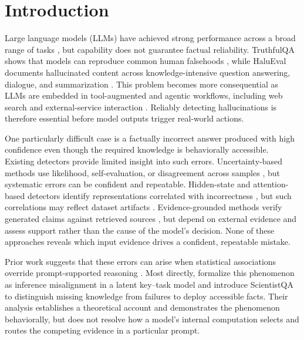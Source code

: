 

\section{Introduction}
\label{sec:introduction}
Large language models (LLMs) have achieved strong performance across a broad range of tasks \citep{openai2024gpt4,geminiteam2025gemini}, but capability does not guarantee factual reliability.  TruthfulQA shows that models can reproduce common human falsehoods \citep{lin2022truthfulqa}, while HaluEval documents hallucinated content across knowledge-intensive question answering, dialogue, and summarization \citep{li2023halueval}.  This problem becomes more consequential as LLMs are embedded in tool-augmented and agentic workflows, including web search and external-service interaction \citep{nakano2022webgpt,liu2023webglm,steinberger2026openclaw}.  Reliably detecting hallucinations is therefore essential before model outputs trigger real-world actions.

One particularly difficult case is a factually incorrect answer produced with high confidence even though the required knowledge is behaviorally accessible.  Existing detectors provide limited insight into such errors.  Uncertainty-based methods use likelihood, self-evaluation, or disagreement across samples \citep{kadavath2022mostlyknow,manakul2023selfcheckgpt,farquhar2024semanticentropy}, but systematic errors can be confident and repeatable.  Hidden-state and attention-based detectors identify representations correlated with incorrectness \citep{azaria2023internal,chen2024inside,du2024haloscope,chuang2024lookback,binkowski2025spectral}, but such correlations may reflect dataset artifacts \citep{janiak2025illusion}.  Evidence-grounded methods verify generated claims against retrieved sources \citep{min2023factscore}, but depend on external evidence and assess support rather than the cause of the model's decision.  None of these approaches reveals which input evidence drives a confident, repeatable mistake.

Prior work suggests that these errors can arise when statistical associations override prompt-supported reasoning \citet{mckenna2023sources, sun2025subsequence}. Most directly, \citet{hu2026reasoningpriors} formalize this phenomenon as inference misalignment in a latent key--task model and introduce ScientistQA to distinguish missing knowledge from failures to deploy accessible facts.  Their analysis establishes a theoretical account and demonstrates the phenomenon behaviorally, but does not resolve how a model's internal computation selects and routes the competing evidence in a particular prompt.  

